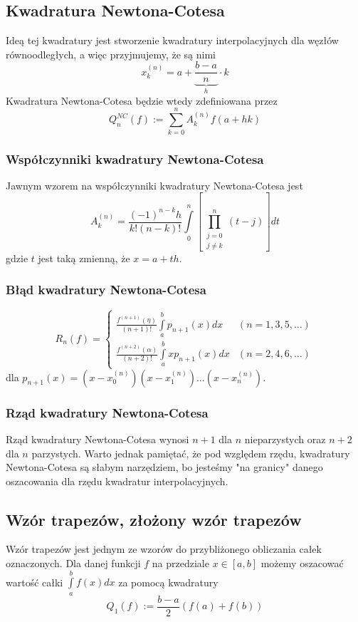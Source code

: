 \documentclass[a4paper,11pt]{article}
\begin{document}
\subsection{Kwadratura Newtona-Cotesa}
Ideą tej kwadratury jest stworzenie kwadratury interpolacyjnych dla węzłów równoodległych, a więc przyjmujemy, że są nimi 
$$x_k^{(n)}=a+\underbrace{\frac{b-a}{n}}_{h} \cdot k$$
\noindent Kwadratura Newtona-Cotesa będzie wtedy zdefiniowana przez
$$ Q_n^{NC}(f) := \sum\limits_{k=0}^{n} A_k^{(n)} f(a+hk) $$

\subsubsection{Współczynniki kwadratury Newtona-Cotesa}
Jawnym wzorem na współczynniki kwadratury Newtona-Cotesa jest
$$ A_k^{(n)} = \frac{(-1)^{n-k}h}{k!(n-k)!} \int\limits_{0}^{n} \left[ \prod\limits_{\substack{j=0 \\ j \neq k}}^{n} (t-j) \right] dt$$
\noindent gdzie $t$ jest taką zmienną, że $x=a+th$.

\subsubsection{Błąd kwadratury Newtona-Cotesa}
$$ R_n(f) = 
\begin{cases}
\frac{f^{(n+1)}(\eta)}{(n+1)!} \int\limits_{a}^{b} p_{n+1}(x)dx		& (n=1,3,5,\ldots) \\
\frac{f^{(n+2)}(\alpha)}{(n+2)!} \int\limits_{a}^{b} x p_{n+1}(x)dx	& (n=2,4,6,\ldots)
\end{cases}
$$
\noindent dla $p_{n+1}(x) = \left( x-x_0^{(n)} \right)\left( x-x_1^{(n)}\right)\ldots\left( x-x_n^{(n)}\right)$.

\subsubsection{Rząd kwadratury Newtona-Cotesa}
Rząd kwadratury Newtona-Cotesa wynosi $n+1$ dla $n$ nieparzystych oraz $n+2$ dla $n$ parzystych. Warto jednak pamiętać, że pod względem rzędu, kwadratury Newtona-Cotesa są słabym narzędziem, bo jesteśmy "na granicy" danego oszacowania dla rzędu kwadratur interpolacyjnych.

\subsection{Wzór trapezów, złożony wzór trapezów}
Wzór trapezów jest jednym ze wzorów do przybliżonego obliczania całek oznaczonych. Dla danej funkcji $f$ na przedziale $x\in[a,b]$ możemy oszacować wartość całki $\int\limits_{a}^{b}f(x)dx$ za pomocą kwadratury
$$ Q_1(f) := \frac{b-a}{2} \left( f(a)+f(b) \right) $$
\end{document}
